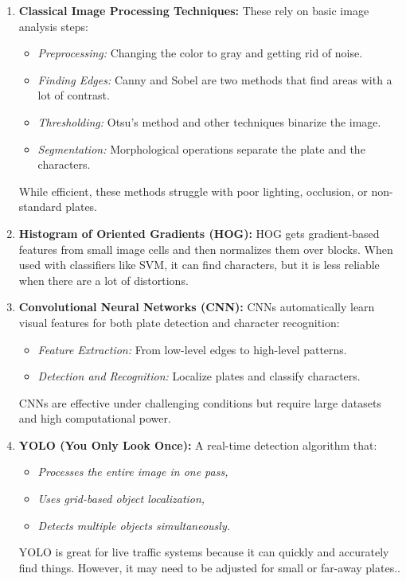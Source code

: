 \documentclass[runningheads]{llncs}
\begin{document}
\begin{enumerate}
    \item \textbf{Classical Image Processing Techniques:}  
    These rely on basic image analysis steps:
    \begin{itemize}
       	\item \textit{Preprocessing:} Changing the color to gray and getting rid of noise.
\item \textit{Finding Edges:} Canny and Sobel are two methods that find areas with a lot of contrast.
\item \textit{Thresholding:} Otsu's method and other techniques binarize the image.
\item \textit{Segmentation:} Morphological operations separate the plate and the characters.
    \end{itemize}
    While efficient, these methods struggle with poor lighting, occlusion, or non-standard plates.

    \item \textbf{Histogram of Oriented Gradients (HOG):}  
    HOG gets gradient-based features from small image cells and then normalizes them over blocks. When used with classifiers like SVM, it can find characters, but it is less reliable when there are a lot of distortions.

    \item \textbf{Convolutional Neural Networks (CNN):}  
    CNNs automatically learn visual features for both plate detection and character recognition:
    \begin{itemize}
        \item \textit{Feature Extraction:} From low-level edges to high-level patterns.
        \item \textit{Detection and Recognition:} Localize plates and classify characters.
    \end{itemize}
    CNNs are effective under challenging conditions but require large datasets and high computational power.

    \item \textbf{YOLO (You Only Look Once):}  
    A real-time detection algorithm that:
    \begin{itemize}
        \item \textit{Processes the entire image in one pass,}
        \item \textit{Uses grid-based object localization,}
        \item \textit{Detects multiple objects simultaneously.}
    \end{itemize}
    YOLO is great for live traffic systems because it can quickly and accurately find things. However, it may need to be adjusted for small or far-away plates..
\end{enumerate}
\end{document}
